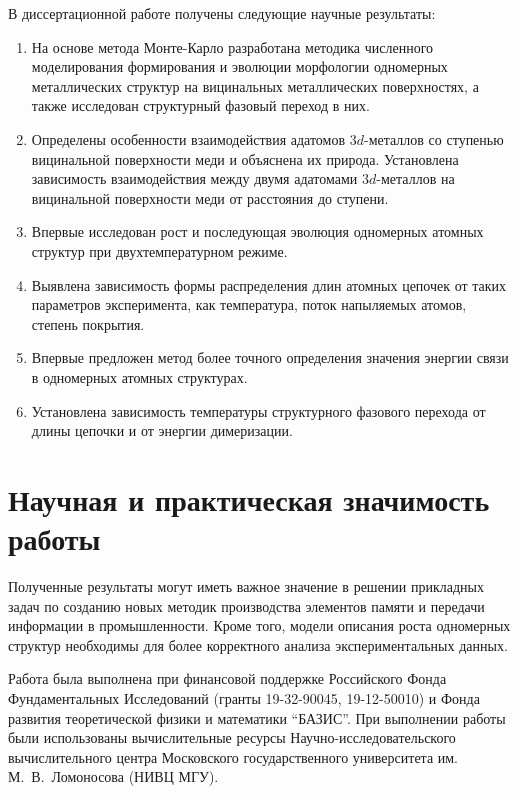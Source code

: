 \documentclass[10pt]{book}
\begin{document}
В диссертационной работе получены следующие научные результаты:
\begin{enumerate}
	\item На основе метода Монте-Карло разработана методика численного моделирования формирования и эволюции морфологии одномерных металлических структур на вицинальных металлических поверхностях, а также исследован структурный фазовый переход в них.
	\item Определены особенности взаимодействия адатомов $3d$-металлов со ступенью вицинальной поверхности меди и объяснена их природа. Установлена зависимость взаимодействия между двумя адатомами $3d$-металлов на вицинальной поверхности меди от расстояния до ступени.
	\item Впервые исследован рост и последующая эволюция одномерных атомных структур при двухтемпературном режиме.
	\item Выявлена зависимость формы распределения длин атомных цепочек от таких параметров эксперимента, как температура, поток напыляемых атомов, степень покрытия.
	\item Впервые предложен метод более точного определения значения энергии связи в одномерных атомных структурах.
	\item Установлена зависимость температуры структурного фазового перехода от длины цепочки  и от энергии димеризации.
\end{enumerate}




\section{Научная и практическая значимость работы}
Полученные результаты могут иметь важное значение в решении прикладных задач по созданию новых методик производства элементов памяти и передачи информации в промышленности. Кроме того, модели описания роста одномерных структур необходимы для более корректного анализа экспериментальных данных.

Работа была  выполнена при финансовой поддержке Российского Фонда Фундаментальных Исследований (гранты 19-32-90045, 19-12-50010) и Фонда развития теоретической физики и математики ``БАЗИС''. При выполнении работы были использованы вычислительные ресурсы Научно-исследовательского вычислительного центра Московского государственного университета им. М.~В.~Ломоносова (НИВЦ МГУ).
\end{document}
